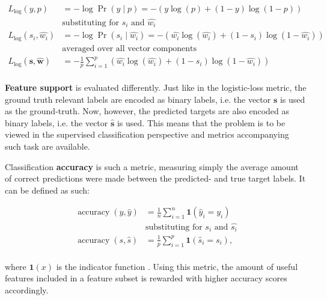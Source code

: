 \documentclass{article}
\begin{document}
\begin{equation}
\begin{aligned}
L_{\log }(y, p) &= -\log \operatorname{Pr}(y \mid p)=-(y \log (p)+(1-y) \log (1-p)) \\
&\text{substituting for } s_i \text{ and } \hat{w_i}\\
L_{\log }(s_i, \hat{w_i}) &= -\log \operatorname{Pr}(s_i \mid \hat{w_i})= -(\hat{w_i} \log (\hat{w_i})+(1-s_i) \log (1-\hat{w_i})) \\
&\text{averaged over all vector components }\\
L_{\log }(\boldsymbol{s}, \hat{\boldsymbol{w}}) &= - \frac{1}{p} \sum_{i=1}^p (\hat{w_i} \log (\hat{w_i})+(1-s_i) \log (1-\hat{w_i})) \\
\end{aligned}
\end{equation}

\textbf{Feature support} is evaluated differently. Just like in the logistic-loss metric, the ground truth relevant labels are encoded as binary labels, i.e. the vector $\boldsymbol{s}$ is used as the ground-truth. Now, however, the predicted targets are also encoded as binary labels, i.e. the vector $\hat{\boldsymbol{s}}$ is used. This means that the problem is to be viewed in the supervised classification perspective and metrics accompanying such task are available.

Classification \textbf{accuracy} is such a metric, measuring simply the average amount of correct predictions were made between the predicted- and true target labels. It can be defined as such:

\begin{equation}
\begin{aligned}
\operatorname{accuracy}(y, \hat{y}) &= \frac{1}{n} \sum_{i=1}^{n} \boldsymbol{1} \left(\hat{y}_{i}=y_{i}\right) \\
&\text{substituting for } s_i \text{ and } \hat{s_i}\\
\operatorname{accuracy}(s, \hat{s}) &= \frac{1}{p} \sum_{i=1}^{p} \boldsymbol{1} \left(\hat{s}_{i}=s_{i}\right), \\
\end{aligned}
\end{equation}

where $\boldsymbol{1}(x)$ is the indicator function \citep{davis_undecidable_2004}. Using this metric, the amount of useful features included in a feature subset is rewarded with higher accuracy scores accordingly.
\end{document}
